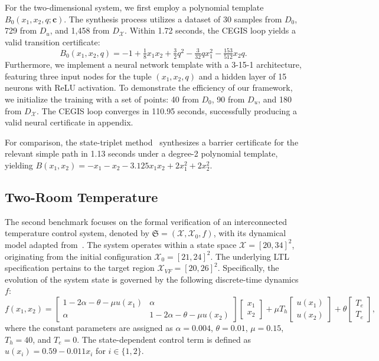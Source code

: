 For the two-dimensional system, we first employ a polynomial template $B_0(x_1, x_2, q; \mathbf{c})$. The synthesis process utilizes a dataset of 30 samples from $D_0$, 729 from $D_u$, and 1,458 from $D_{\mathcal{X}}$. Within 1.72 seconds, the CEGIS loop yields a valid transition certificate:
\begin{equation}
B_0(x_1, x_2, q) = -1 + \tfrac{1}{8}x_1 x_2 + \tfrac{3}{2}q^2 - \tfrac{3}{32}q x_1^2 - \tfrac{153}{512}x_2 q.
\end{equation}
Furthermore, we implement a neural network template with a 3-15-1 architecture, featuring three input nodes for the tuple $(x_1, x_2, q)$ and a hidden layer of 15 neurons with ReLU activation. To demonstrate the efficiency of our framework, we initialize the training with a set of points: 40 from $D_0$, 90 from $D_u$, and 180 from $D_{\mathcal{X}}$. The CEGIS loop converges in 110.95 seconds, successfully producing a valid neural certificate in appendix.

For comparison, the state-triplet method~\cite{wongpiromsarn2015automata} synthesizes a barrier certificate for the relevant simple path in 1.13 seconds under a degree-2 polynomial template, yielding $B(x_1,x_2)=-x_1-x_2-3.125x_1x_2+2x_1^2+2x_2^2$.

\subsection{Two-Room Temperature}

The second benchmark focuses on the formal verification of an interconnected temperature control system, denoted by $\mathfrak{S} = (\mathcal{X}, \mathcal{X}_0, f)$, with its dynamical model adapted from~\cite{anand2024compositional}. The system operates within a state space $\mathcal{X} = [20, 34]^2$, originating from the initial configuration $\mathcal{X}_0 = [21, 24]^2$. The underlying LTL specification pertains to the target region $\mathcal{X}_{VF} = [20, 26]^2$. Specifically, the evolution of the system state is governed by the following discrete-time dynamics $f$:
\begin{equation}
f(x_1, x_2) = 
\begin{bmatrix} 1 - 2\alpha - \theta - \mu u(x_1) & \alpha \\ \alpha & 1 - 2\alpha - \theta - \mu u(x_2) \end{bmatrix}
\begin{bmatrix} x_1 \\ x_2 \end{bmatrix}
+ \mu T_h
\begin{bmatrix} u(x_1) \\ u(x_2) \end{bmatrix}
+ \theta
\begin{bmatrix} T_e \\ T_e \end{bmatrix},
\end{equation}
where the constant parameters are assigned as $\alpha = 0.004$, $\theta = 0.01$, $\mu = 0.15$, $T_h = 40$, and $T_e = 0$. The state-dependent control term is defined as $u(x_i) = 0.59 - 0.011 x_i$ for $i \in \{1, 2\}$.



